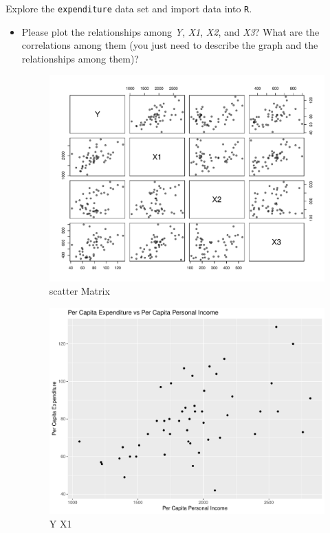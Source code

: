 \documentclass[12pt,letterpaper]{article}
\begin{document}
\vspace{.5cm}
\noindent Explore the \texttt{expenditure} data set and import data into \texttt{R}.
\begin{itemize}
\item
Please plot the relationships among \emph{Y}, \emph{X1}, \emph{X2}, and \emph{X3}? What are the correlations among them (you just need to describe the graph and the relationships among them)?
  

\begin{figure}[h!]\centering
	\caption{\footnotesize scatter Matrix}
	\label{fig:1}
	\includegraphics[width=.75\textwidth]{scatter_Matrix.pdf}
\end{figure}

 \begin{figure}[h!]\centering
	\caption{\footnotesize Y X1}
	\label{fig:3}
	\includegraphics[width=.75\textwidth]{plot_Y_X1.pdf}
\end{figure}


\end{itemize}
\end{document}
